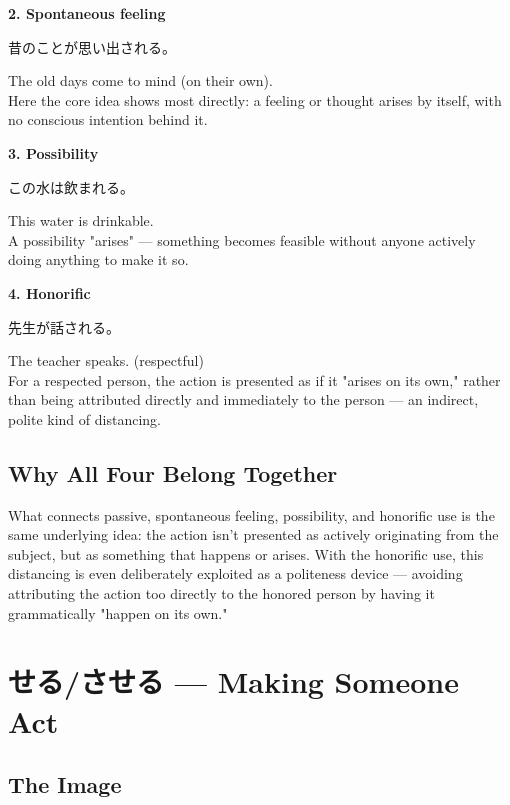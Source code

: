\documentclass[12pt]{book}
\begin{document}
\textbf{2. Spontaneous feeling}
\par\quad 昔のことが思い出される。\\
\par\quad The old days come to mind (on their own).\\

Here the core idea shows most directly: a feeling or thought arises by itself, with no conscious intention behind it.

\textbf{3. Possibility}
\par\quad この水は飲まれる。\\
\par\quad This water is drinkable.\\

A possibility "arises" — something becomes feasible without anyone actively doing anything to make it so.

\textbf{4. Honorific}
\par\quad 先生が話される。\\
\par\quad The teacher speaks. (respectful)\\

For a respected person, the action is presented as if it "arises on its own," rather than being attributed directly and immediately to the person — an indirect, polite kind of distancing.

\section*{Why All Four Belong Together}

What connects passive, spontaneous feeling, possibility, and honorific use is the same underlying idea: the action isn't presented as actively originating from the subject, but as something that happens or arises. With the honorific use, this distancing is even deliberately exploited as a politeness device — avoiding attributing the action too directly to the honored person by having it grammatically "happen on its own."


\chapter{せる/させる — Making Someone Act}

\section*{The Image}
\end{document}
